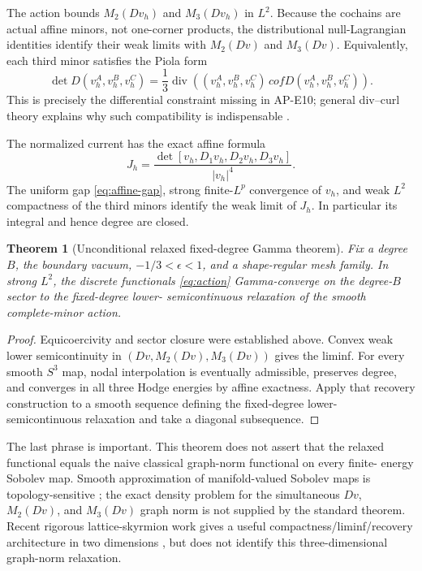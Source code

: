 \documentclass[11pt]{article}
\newtheorem{theorem}{Theorem}[section]
\begin{document}
The action bounds $M_2(Dv_h)$ and $M_3(Dv_h)$ in $L^2$.  Because the
cochains are actual affine minors, not one-corner products, the distributional
null-Lagrangian identities identify their weak limits with $M_2(Dv)$ and
$M_3(Dv)$.  Equivalently, each third minor satisfies the Piola form
\begin{equation}
 \det D(v_h^{A},v_h^{B},v_h^{C})
 =\frac13\operatorname{div}
 \left((v_h^{A},v_h^{B},v_h^{C})\,cof
 D(v_h^{A},v_h^{B},v_h^{C})\right).
 \label{eq:piola}
\end{equation}
This is precisely the differential constraint missing in AP-E10; general
div--curl theory explains why such compatibility is indispensable
\cite{BrianeCasadoDiaz2016}.

The normalized current has the exact affine formula
\begin{equation}
 J_h=\frac{\det[v_h,D_1v_h,D_2v_h,D_3v_h]}{|v_h|^4}.
 \label{eq:current}
\end{equation}
The uniform gap \eqref{eq:affine-gap}, strong finite-$L^p$ convergence of
$v_h$, and weak $L^2$ compactness of the third minors identify the weak
limit of $J_h$.  In particular its integral and hence degree are closed.

\begin{theorem}[Unconditional relaxed fixed-degree Gamma theorem]
Fix a degree $B$, the boundary vacuum, $-1/3<\epsilon<1$, and a shape-regular
mesh family.  In strong $L^2$, the discrete functionals \eqref{eq:action}
Gamma-converge on the degree-$B$ sector to the fixed-degree lower-
semicontinuous relaxation of the smooth complete-minor action.
\end{theorem}

\begin{proof}
Equicoercivity and sector closure were established above.  Convex weak lower
semicontinuity in $(Dv,M_2(Dv),M_3(Dv))$ gives the liminf.  For every smooth
$S^3$ map, nodal interpolation is eventually admissible, preserves degree,
and converges in all three Hodge energies by affine exactness.  Apply that
recovery construction to a smooth sequence defining the fixed-degree lower-
semicontinuous relaxation and take a diagonal subsequence.
\end{proof}

The last phrase is important.  This theorem does not assert that the relaxed
functional equals the naive classical graph-norm functional on every finite-
energy Sobolev map.  Smooth approximation of manifold-valued Sobolev maps is
topology-sensitive \cite{Bethuel1991}; the exact density problem for the
simultaneous $Dv$, $M_2(Dv)$, and $M_3(Dv)$ graph norm is not supplied by the
standard theorem.  Recent rigorous lattice-skyrmion work gives a useful
compactness/liminf/recovery architecture in two dimensions
\cite{BrianiCicaleseKreutz2026}, but does not identify this three-dimensional
graph-norm relaxation.
\end{document}

